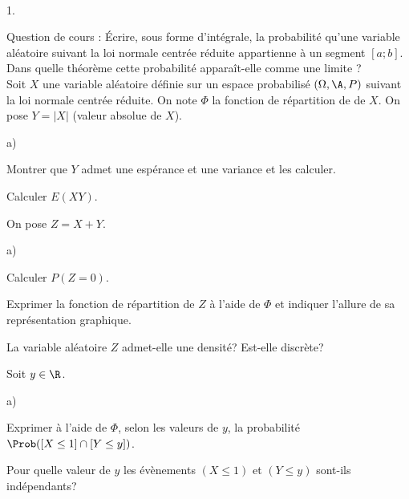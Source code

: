 \documentclass[11pt]{article}%
\begin{document}
\begin{exerciceAP}~\\
  \begin{noliste}{1.}
    \setlength{\itemsep}{2mm}
  \item Question de cours : Écrire, sous forme d'intégrale, la
    probabilité qu'une variable aléatoire suivant la loi normale
    centrée réduite appartienne à un segment $[a;b]$. Dans quelle
    théorème cette probabilité apparaît-elle comme une limite ?\\

    Soit $X$ une variable aléatoire définie sur un espace probabilisé
    $(\Omega , \A , P)$ suivant la loi normale centrée réduite. On
    note $\Phi$ la fonction de répartition de de $X$. On pose $Y =
    \vert X \vert$ (valeur absolue de $X$).

  \item 
    \begin{noliste}{a)}
    \setlength{\itemsep}{2mm}
    \item Montrer que $Y$ admet une espérance et une variance et les calculer.
    \item Calculer $E ( X Y )$.
    \end{noliste}

  \item On pose $Z = X + Y$. 
    \begin{noliste}{a)}
    \setlength{\itemsep}{2mm}
    \item Calculer $P ( Z=0 )$.
    \item Exprimer la fonction de répartition de $Z$ à l'aide de
      $\Phi$ et indiquer l'allure de sa représentation graphique.
    \item La variable aléatoire $Z$ admet-elle une densité? Est-elle discrète?
    \end{noliste}

  \item Soit $y \in \R$. 
    \begin{noliste}{a)}
    \setlength{\itemsep}{2mm}
    \item Exprimer à l'aide de $\Phi$, selon les valeurs de $y$, la
      probabilité $\Prob( [X \leq 1] \cap [Y \leq y] )$.
    \item Pour quelle valeur de $y$ les évènements $(X \leq 1)$ et $(Y
      \leq y)$ sont-ils indépendants?
    \end{noliste}
  \end{noliste}
\end{exerciceAP}
\end{document}
